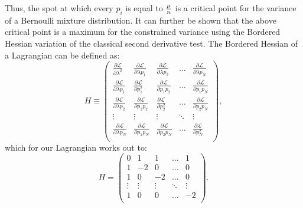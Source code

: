 Thus, the spot at which every $p_i$ is equal to $\frac{\mu}{n}$ is a critical point for the variance of a Bernoulli mixture distribution. It can further be shown that the above critical point is a maximum for the constrained variance using the Bordered Hessian variation of the classical second derivative test. The Bordered Hessian\supercite{Magnus:1999vh} of a Lagrangian can be defined as:
\begin{equation*}
    H \equiv \left(
        \begin{array}{ccccc}
            \frac{\partial \mathcal{L}}{\partial \lambda ^2} & \frac{\partial \mathcal{L}}{\partial \lambda  p_1} & \frac{\partial \mathcal{L}}{\partial \lambda  p_2} & \ldots  & \frac{\partial \mathcal{L}}{\partial \lambda  p_N} \\
            \frac{\partial \mathcal{L}}{\partial \lambda  p_1} & \frac{\partial \mathcal{L}}{\partial p_1^2} & \frac{\partial \mathcal{L}}{\partial p_1 p_2} & \ldots  & \frac{\partial \mathcal{L}}{\partial p_1 p_N} \\
            \frac{\partial \mathcal{L}}{\partial \lambda  p_2} & \frac{\partial \mathcal{L}}{\partial p_1 p_2} & \frac{\partial \mathcal{L}}{\partial p_2^2} & \ldots  & \frac{\partial \mathcal{L}}{\partial p_2 p_N} \\
            \vdots  & \vdots  & \vdots  & \ddots & \vdots  \\
            \frac{\partial \mathcal{L}}{\partial \lambda  p_N} & \frac{\partial \mathcal{L}}{\partial p_1 p_N} & \frac{\partial \mathcal{L}}{\partial p_2 p_N} & \ldots  & \frac{\partial \mathcal{L}}{\partial p_N^2} \\
        \end{array}
    \right),
\end{equation*}
which for our Lagrangian works out to:
\begin{equation}
\label{eq:bordered_hessian_concrete}
    H=\left(
        \begin{array}{ccccc}
            0 & 1 & 1 & \ldots  & 1 \\
            1 & -2 & 0 & \ldots  & 0 \\
            1 & 0 & -2 & \ldots  & 0 \\
            \vdots  & \vdots  & \vdots  & \ddots & \vdots  \\
            1 & 0 & 0 & \ldots  & -2 \\
        \end{array}
    \right).
\end{equation}

